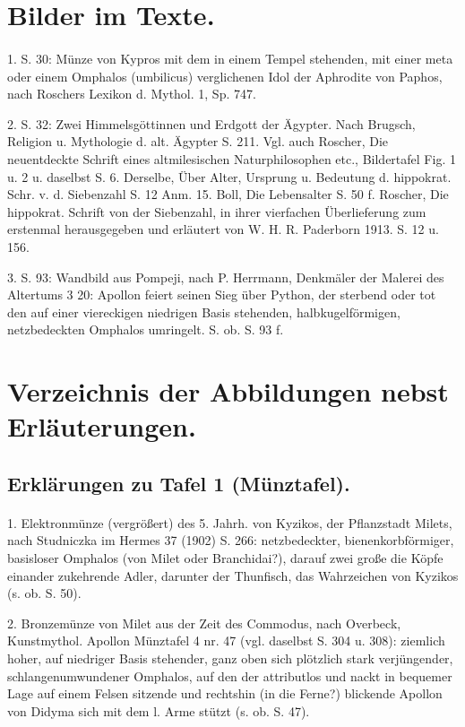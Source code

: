 \documentclass[a4paper, 11pt, oneside]{article}
\begin{document}
\section{Bilder im Texte.}
\paragraph{}
1. S. 30: Münze von Kypros mit dem in einem Tempel stehenden, mit einer meta oder einem Omphalos (umbilicus) verglichenen Idol der Aphrodite von Paphos, nach Roschers Lexikon d. Mythol. 1, Sp. 747.

2. S. 32: Zwei Himmelsgöttinnen und Erdgott der Ägypter. Nach Brugsch, Religion u. Mythologie d. alt. Ägypter S. 211. Vgl. auch Roscher, Die neuentdeckte Schrift eines altmilesischen Naturphilosophen etc., Bildertafel Fig. 1 u. 2 u. daselbst S. 6. Derselbe, Über Alter, Ursprung u. Bedeutung d. hippokrat. Schr. v. d. Siebenzahl S. 12 Anm. 15. Boll, Die Lebensalter S. 50 f. Roscher, Die hippokrat. Schrift von der Siebenzahl, in ihrer vierfachen Überlieferung zum erstenmal herausgegeben und erläutert von W. H. R. Paderborn 1913. S. 12 u. 156.

3. S. 93: Wandbild aus Pompeji, nach P. Herrmann, Denkmäler der Malerei des Altertums 3 20: Apollon feiert seinen Sieg über Python, der sterbend oder tot den auf einer viereckigen niedrigen Basis stehenden, halbkugelförmigen, netzbedeckten Omphalos umringelt. S. ob. S. 93 f.
\clearpage
\section{Verzeichnis der Abbildungen nebst Erläuterungen.}
\subsection{Erklärungen zu Tafel 1 (Münztafel).}
\paragraph{}
1. Elektronmünze (vergrößert) des 5. Jahrh. von Kyzikos, der Pflanzstadt Milets, nach Studniczka im Hermes 37 (1902) S. 266: netzbedeckter, bienenkorbförmiger, basisloser Omphalos (von Milet oder Branchidai?), darauf zwei große die Köpfe einander zukehrende Adler, darunter der Thunfisch, das Wahrzeichen von Kyzikos (s. ob. S. 50).

2. Bronzemünze von Milet aus der Zeit des Commodus, nach Overbeck, Kunstmythol. Apollon Münztafel 4 nr. 47 (vgl. daselbst S. 304 u. 308): ziemlich hoher, auf niedriger Basis stehender, ganz oben sich plötzlich stark verjüngender, schlangenumwundener Omphalos, auf den der attributlos und nackt in bequemer Lage auf einem Felsen sitzende und rechtshin (in die Ferne?) blickende Apollon von Didyma sich mit dem l. Arme stützt (s. ob. S. 47).
\end{document}
